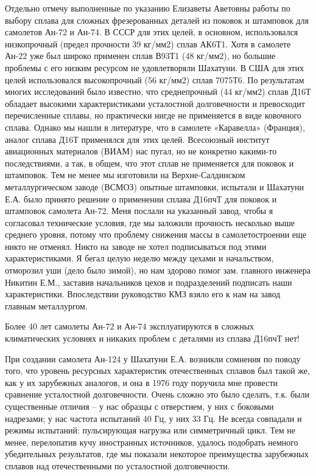 Отдельно отмечу выполненные по указанию Елизаветы Аветовны работы по выбору
сплава для сложных фрезерованных деталей из поковок и штамповок для самолетов
Ан-72 и Ан-74. В СССР для этих целей, в основном, использовался низкопрочный
(предел прочности 39 кг/мм2) сплав АК6Т1. Хотя в самолете Ан-22 уже был широко
применен сплав В93Т1 (48 кг/мм2), но большие проблемы с его низким ресурсом не
удовлетворяли Шахатуни. В США для этих целей использовался высокопрочный (56
кг/мм2) сплав 7075Т6. По результатам многих исследований было известно, что
среднепрочный (44 кг/мм2) сплав Д16Т обладает высокими характеристиками
усталостной долговечности и превосходит перечисленные сплавы, но практически
нигде не применяется в виде ковочного сплава. Однако мы нашли в литературе, что
в самолете «Каравелла» (Франция), аналог сплава Д16Т применялся для этих целей.
Всесоюзный институт авиационных материалов (ВИАМ) нас пугал, но не конкретно
какими-то последствиями, а так, в общем, что этот сплав не применяется для
поковок и штамповок. Тем не менее мы изготовили на Верхне-Салдинском
металлургическом заводе (ВСМОЗ) опытные штамповки, испытали и Шахатуни Е.А.
было принято решение о применении сплава Д16пчТ для поковок и штамповок
самолета Ан-72. Меня послали на указанный завод, чтобы я согласовал технические
условия, где мы заложили прочность несколько выше среднего уровня, потому что
проблему снижения массы в самолетостроении еще никто не отменял. Никто на
заводе не хотел подписываться под этими характеристиками. Я бегал целую неделю
между цехами и начальством, отморозил уши (дело было зимой), но нам здорово
помог зам. главного инженера Никитин Е.М., заставив начальников цехов и
подразделений подписать наши характеристики. Впоследствии руководство КМЗ взяло
его к нам на завод главным металлургом.

Более 40 лет самолеты Ан-72 и Ан-74 эксплуатируются в сложных климатических
условиях и никаких проблем с деталями из сплава Д16пчТ нет!

При создании самолета Ан-124 у Шахатуни Е.А. возникли сомнения по поводу того,
что уровень ресурсных характеристик отечественных сплавов был такой же, как у
их зарубежных аналогов, и она в 1976 году поручила мне провести сравнение
усталостной долговечности. Очень сложно это было сделать, т.к. были
существенные отличия – у нас образцы с отверстием, у них с боковыми надрезами;
у нас частота испытаний 40 Гц, у них 33 Гц. Не всегда совпадали и режимы
испытаний: пульсирующая нагрузка или симметричный цикл. Тем не менее,
перелопатив кучу иностранных источников, удалось подобрать немного убедительных
результатов, где мы показали некоторое преимущества зарубежных сплавов над
отечественными по усталостной долговечности.

